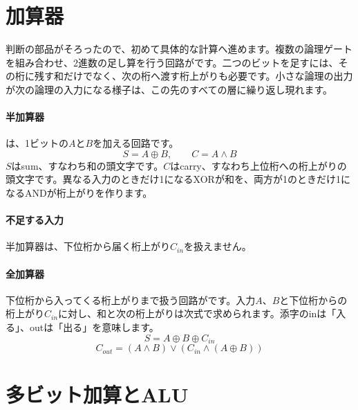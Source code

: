 \section{加算器}
\label{sec:01-digital-computer-08}

判断の部品がそろったので、初めて具体的な計算へ進めます。複数の論理ゲートを組み合わせ、2進数の足し算を行う回路がです。二つのビットを足すには、その桁に残す和だけでなく、次の桁へ渡す桁上がりも必要です。小さな論理の出力が次の論理の入力になる様子は、この先のすべての層に繰り返し現れます。

\begingroup
\begingroup
\paragraph{半加算器}
        は、1ビットの$A$と$B$を加える回路です。
        \[
          S=A\oplus B,\qquad C=A\land B
        \]
        $S$はsum、すなわち和の頭文字です。$C$はcarry、すなわち上位桁への桁上がりの頭文字です。異なる入力のときだけ1になるXORが和を、両方が1のときだけ1になるANDが桁上がりを作ります。

\paragraph{不足する入力}
        半加算器は、下位桁から届く桁上がり$C_{in}$を扱えません。

\par
\endgroup
\medskip
\begingroup
\begin{samepage}
\paragraph{全加算器}
        下位桁から入ってくる桁上がりまで扱う回路がです。入力$A$、$B$と下位桁からの桁上がり$C_{in}$に対し、和と次の桁上がりは次式で求められます。添字のinは「入る」、outは「出る」を意味します。
        \[
          S=A\oplus B\oplus C_{in}
        \]
        \[
          C_{out}=(A\land B)\lor(C_{in}\land(A\oplus B))
        \]

      \par\smallskip
      \begin{center}
      \end{center}
\end{samepage}
\par
\endgroup
\par
\endgroup


\section{多ビット加算とALU}
\label{sec:01-digital-computer-09}

